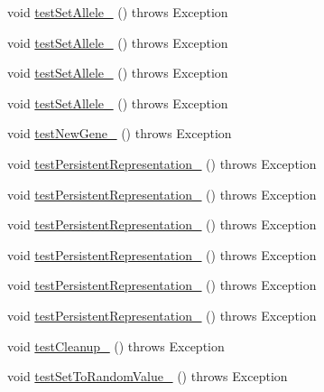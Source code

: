 \begin{DoxyCompactItemize}
\item 
void \hyperlink{classorg_1_1jgap_1_1impl_1_1_double_gene_test_a429cde3cbcb0012403489832033a0ae3}{test\-Set\-Allele\-\_} ()  throws Exception 
\item 
void \hyperlink{classorg_1_1jgap_1_1impl_1_1_double_gene_test_a6e2fa115a36266ab319e1ed06aa94a9a}{test\-Set\-Allele\-\_} ()  throws Exception 
\item 
void \hyperlink{classorg_1_1jgap_1_1impl_1_1_double_gene_test_a8a382c48b3a10e03189bcc4c9d21a936}{test\-Set\-Allele\-\_} ()  throws Exception 
\item 
void \hyperlink{classorg_1_1jgap_1_1impl_1_1_double_gene_test_af8168e17d3165a64df57d0313a4ed347}{test\-Set\-Allele\-\_} ()  throws Exception 
\item 
void \hyperlink{classorg_1_1jgap_1_1impl_1_1_double_gene_test_a9d68c86ea47f39668f53933cf44ead28}{test\-New\-Gene\-\_} ()  throws Exception 
\item 
void \hyperlink{classorg_1_1jgap_1_1impl_1_1_double_gene_test_afa732f7d8bf261c438d567c4ed082c84}{test\-Persistent\-Representation\-\_} ()  throws Exception 
\item 
void \hyperlink{classorg_1_1jgap_1_1impl_1_1_double_gene_test_a70df4f18790ab734b9f4f0b288ae2e45}{test\-Persistent\-Representation\-\_} ()  throws Exception 
\item 
void \hyperlink{classorg_1_1jgap_1_1impl_1_1_double_gene_test_ab48bea367089cd98018f9f78a0960093}{test\-Persistent\-Representation\-\_} ()  throws Exception 
\item 
void \hyperlink{classorg_1_1jgap_1_1impl_1_1_double_gene_test_a40bd62013d7dff3d9daddb5292fbf398}{test\-Persistent\-Representation\-\_} ()  throws Exception 
\item 
void \hyperlink{classorg_1_1jgap_1_1impl_1_1_double_gene_test_acb7acfbc8a107fd6f0759ab3a8fe5b7b}{test\-Persistent\-Representation\-\_} ()  throws Exception 
\item 
void \hyperlink{classorg_1_1jgap_1_1impl_1_1_double_gene_test_ad73839ac122ce8cf8cfd4d9486a09da2}{test\-Persistent\-Representation\-\_} ()  throws Exception 
\item 
void \hyperlink{classorg_1_1jgap_1_1impl_1_1_double_gene_test_a67bdae49d3b8d05e3f6e378c959de0dd}{test\-Cleanup\-\_} ()  throws Exception 
\item 
void \hyperlink{classorg_1_1jgap_1_1impl_1_1_double_gene_test_aaf1b3d6e463af7c30a9653321fa2d2c3}{test\-Set\-To\-Random\-Value\-\_} ()  throws Exception 
\item 

\end{DoxyCompactItemize}
